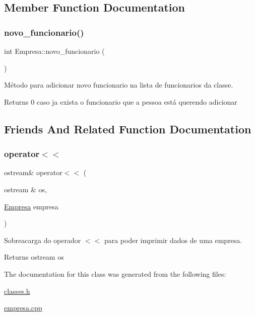 \subsection{Member Function Documentation}
\mbox{\label{classEmpresa_a2bc3f3fc539f62491c5ba59c44e37723}} 
\subsubsection{\texorpdfstring{novo\+\_\+funcionario()}{novo\_funcionario()}}
{\footnotesize\ttfamily int Empresa\+::novo\+\_\+funcionario (\begin{DoxyParamCaption}{ }\end{DoxyParamCaption})}



Método para adicionar novo funcionario na lista de funcionarios da classe. 

\begin{DoxyReturn}{Returns}
0 caso ja exista o funcionario que a pessoa está querendo adicionar 
\end{DoxyReturn}


\subsection{Friends And Related Function Documentation}
\mbox{\label{classEmpresa_a09889fd249bbf085dad71d637538359f}} 
\subsubsection{\texorpdfstring{operator$<$$<$}{operator<<}}
{\footnotesize\ttfamily ostream\& operator$<$$<$ (\begin{DoxyParamCaption}\item[{ostream \&}]{os,  }\item[{\hyperlink{classEmpresa}{Empresa}}]{empresa }\end{DoxyParamCaption})\hspace{0.3cm}{\ttfamily [friend]}}



Sobreacarga do operador $<$$<$ para poder imprimir dados de uma empresa. 

\begin{DoxyReturn}{Returns}
ostream os 
\end{DoxyReturn}


The documentation for this class was generated from the following files\+:\begin{DoxyCompactItemize}
\item 
\hyperlink{classes_8h}{classes.\+h}\item 
\hyperlink{empresa_8cpp}{empresa.\+cpp}\end{DoxyCompactItemize}
